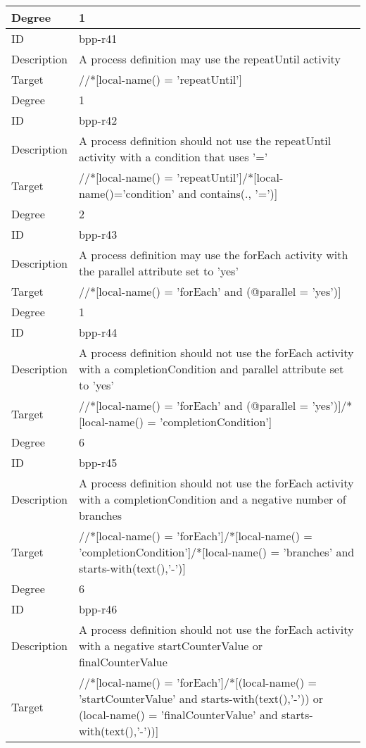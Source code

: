 \begin{center}
\begin{tiny}
\begin{longtable}{p{}|p{}}
\myrowcolour
Degree & 1\\
\midrule
ID & bpp-r41\\
\myrowcolour
Description &A process definition may use the repeatUntil activity\\
Target & //*[local-name() = 'repeatUntil']\\
\myrowcolour
Degree & 1\\
\midrule
ID & bpp-r42\\
\myrowcolour
Description &A process definition should not use the repeatUntil activity with a condition that uses '='\\
Target & //*[local-name() = 'repeatUntil']/*[local-name()='condition' and contains(., '=')]\\
\myrowcolour
Degree & 2\\
\midrule
ID & bpp-r43\\
\myrowcolour
Description &A process definition may use the forEach activity with the parallel attribute set to 'yes'\\
Target & //*[local-name() = 'forEach' and (@parallel = 'yes')]\\
\myrowcolour
Degree & 1\\
\midrule
ID & bpp-r44\\
\myrowcolour
Description &A process definition should not use the forEach activity with a completionCondition and parallel attribute set to 'yes'\\
Target & //*[local-name() = 'forEach' and (@parallel = 'yes')]/*[local-name() = 'completionCondition']\\
\myrowcolour
Degree & 6\\
\midrule
ID & bpp-r45\\
\myrowcolour
Description &A process definition should not use the forEach activity with a completionCondition and a negative number of branches\\
Target & //*[local-name() = 'forEach']/*[local-name() = 'completionCondition']/*[local-name() = 'branches' and starts-with(text(),'-')]\\
\myrowcolour
Degree & 6\\
\midrule
ID & bpp-r46\\
\myrowcolour
Description &A process definition should not use the forEach activity with a negative startCounterValue or finalCounterValue\\
Target & //*[local-name() = 'forEach']/*[(local-name() = 'startCounterValue' and starts-with(text(),'-')) or (local-name() = 'finalCounterValue' and starts-with(text(),'-'))]\\

\end{longtable}
\end{tiny}
\end{center}
